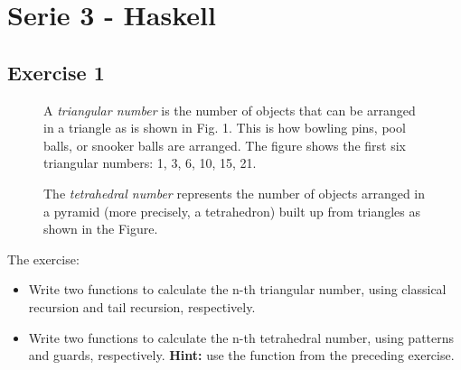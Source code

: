 \documentclass [11pt, a4wide, twoside]{article}
\begin{document}
\section*{Serie 3 - Haskell}
\subsection*{Exercise 1}

\begin{figure}[htb]
\begin{minipage}{.65\textwidth}
A \emph{triangular number} is the number of objects that can be arranged in a triangle as is shown in Fig. 1. This is how bowling pins, pool balls, or snooker balls are arranged. The figure shows the first six triangular numbers: 1, 3, 6, 10, 15, 21.

The \emph{tetrahedral number} represents the number of objects arranged in a pyramid (more precisely, a tetrahedron) built up from triangles as shown in the Figure.
\end{minipage}
\begin{minipage}[c]{.35\textwidth}
\end{minipage}
\end{figure}

\noindent The exercise:
\begin{itemize}
\item Write two functions to calculate the n-th triangular number, using classical recursion and tail recursion, respectively.
\item Write two functions to calculate the n-th tetrahedral number, using patterns and guards, respectively. \textbf{Hint:} use the function from the preceding exercise.
\end{itemize}

\solution{}

\end{document}
